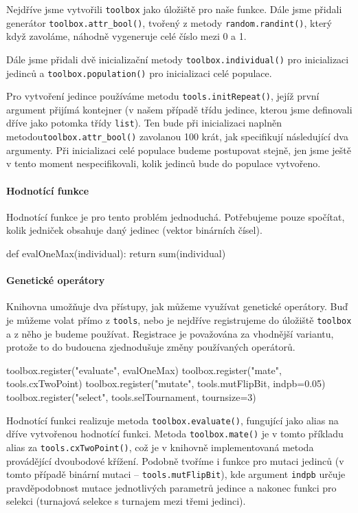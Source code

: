 Nejdříve jsme vytvořili \texttt{toolbox} jako úložiště pro naše funkce. Dále
jsme přidali generátor \texttt{toolbox.attr\_bool()}, tvořený z metody
\texttt{random.randint()}, který když zavoláme, náhodně vygeneruje celé číslo
mezi 0 a 1.

Dále jsme přidali dvě inicializační metody \texttt{toolbox.individual()} pro
inicializaci jedinců a \texttt{toolbox.population()} pro inicializaci celé
populace. 

Pro vytvoření jedince používáme metodu \texttt{tools.initRepeat()}, jejíž první
argument přijímá kontejner (v našem případě třídu jedince, kterou jsme
definovali dříve jako potomka třídy \texttt{list}). Ten bude při inicializaci
naplněn metodou\texttt{toolbox.attr\_bool()} zavolanou 100 krát, jak
specifikují následující dva argumenty. Při inicializaci celé populace budeme
postupovat stejně, jen jsme ještě v tento moment nespecifikovali, kolik jedinců
bude do populace vytvořeno.

\paragraph{Hodnotící funkce}
Hodnotící funkce je pro tento problém jednoduchá. Potřebujeme pouze spočítat,
kolik jedniček obsahuje daný jedinec (vektor binárních čísel).

\begin{code}
def evalOneMax(individual):
    return sum(individual)
\end{code}

\paragraph{Genetické operátory}
Knihovna umožňuje dva přístupy, jak můžeme využívat genetické operátory. Buď je
můžeme volat přímo z \texttt{tools}, nebo je nejdříve registrujeme do úložiště
\texttt{toolbox} a z něho je budeme používat. Registrace je považována za
vhodnější variantu, protože to do budoucna zjednodušuje změny používaných
operátorů.

\begin{code}
toolbox.register("evaluate", evalOneMax)
toolbox.register("mate", tools.cxTwoPoint)
toolbox.register("mutate", tools.mutFlipBit, indpb=0.05)
toolbox.register("select", tools.selTournament, tournsize=3)
\end{code}

Hodnotící funkci realizuje metoda \texttt{toolbox.evaluate()}, fungující jako
alias na dříve vytvořenou hodnotící funkci. Metoda \texttt{toolbox.mate()} je v
tomto příkladu alias za \texttt{tools.cxTwoPoint()}, což je v knihovně
implementovaná metoda provádějící dvoubodové křížení. Podobně tvoříme i funkce
pro mutaci jedinců (v tomto případě binární mutaci --
\texttt{tools.mutFlipBit}), kde argument \texttt{indpb} určuje pravděpodobnost
mutace jednotlivých parametrů jedince a nakonec funkci pro selekci (turnajová
selekce s turnajem mezi třemi jedinci).
        
